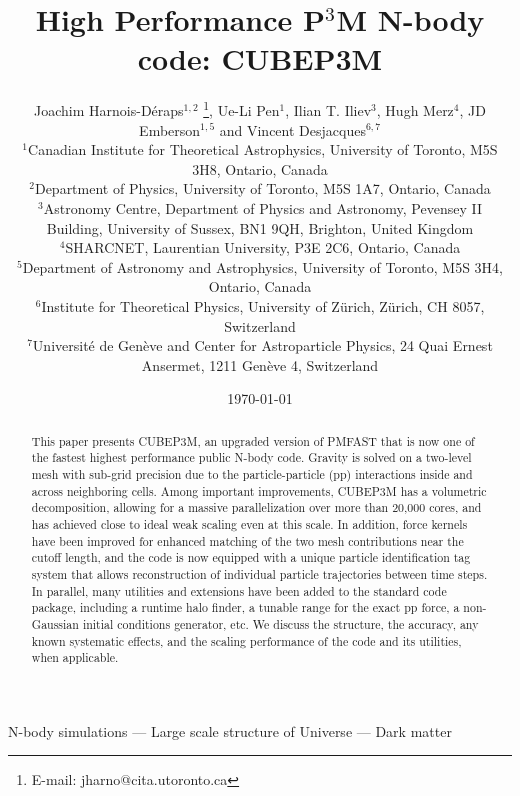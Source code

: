 \documentclass[useAMS,usenatbib]{mn2e}
\title[{\small}  High Performance P$^{3}$M N-body code: CUBEP3M]{{\small} High Performance P$^{3}$M N-body code: CUBEP3M}
\author[Joachim Harnois-D\'{e}raps, Ue-Li Pen, Ilian T. Iliev, Hugh Merz, JD Emberson, Vincent Desjacques]{Joachim Harnois-D\'{e}raps$^{1,2}$ 
\thanks{E-mail: jharno@cita.utoronto.ca},  Ue-Li Pen$^{1}$, 
Ilian T. Iliev$^{3}$, Hugh Merz$^{4}$, \newauthor
JD Emberson$^{1,5}$ and Vincent Desjacques$^{6,7}$\\
$^{1}$Canadian Institute for Theoretical Astrophysics, University of
Toronto, M5S 3H8, Ontario, Canada\\
$^{2}$Department of Physics, University of Toronto, M5S 1A7, Ontario,  Canada\\
$^{3}$Astronomy Centre, Department of Physics and Astronomy, Pevensey II Building, University of Sussex, BN1 9QH, Brighton, United Kingdom\\
$^{4}$SHARCNET, Laurentian University, P3E 2C6, Ontario, Canada\\
$^{5}$Department of Astronomy and Astrophysics, University of Toronto, M5S 3H4, Ontario, Canada\\
$^{6}$Institute for Theoretical Physics, University of Z\"{u}rich, Z\"{u}rich, CH 8057, Switzerland\\
$^{7}$Universit\'{e} de Gen\`{e}ve and Center for Astroparticle Physics, 24 Quai Ernest Ansermet, 1211 Gen\`{e}ve 4, Switzerland}
\begin{document}
\date{\today}

\pagerange{\pageref{firstpage}--\pageref{lastpage}} 

\maketitle

\label{firstpage}

\begin{abstract}
This paper presents {\small CUBEP3M}, an upgraded version of {\small PMFAST} that
is now one of the fastest highest performance public N-body code. 
Gravity is solved  on a two-level mesh with sub-grid precision due to the particle-particle (pp)
interactions inside and across neighboring cells.
Among important improvements,  {\small CUBEP3M} has a volumetric decomposition,
allowing for a massive parallelization over more than 20,000 cores, and has achieved close to ideal weak scaling
even at this scale.  In addition, force kernels have been improved for enhanced matching of the two mesh contributions near the cutoff length, and the code is now equipped with a unique particle identification tag system that allows reconstruction of individual particle trajectories between time steps.
In parallel, many utilities and extensions have been added to the standard code package, 
including a runtime halo finder, a tunable range for the exact pp force, a non-Gaussian initial conditions generator, etc.
We discuss the structure, the accuracy, any known systematic effects, and the scaling performance
of the code and its utilities, when applicable.
\end{abstract}

\begin{keywords}
N-body simulations --- Large scale structure of Universe --- Dark matter
\end{keywords}









%

{}
%

\bsp

\label{lastpage}
\end{document}
